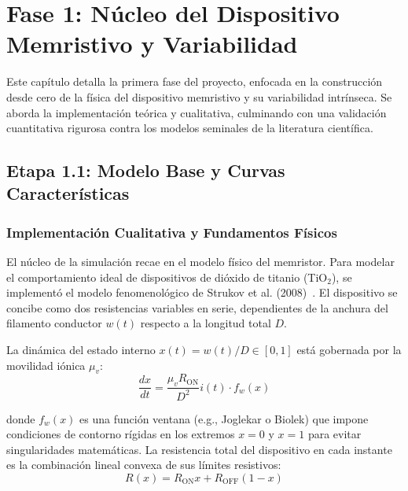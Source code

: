 
\chapter{Fase 1: Núcleo del Dispositivo Memristivo y Variabilidad}
\label{ch:fase1}

Este capítulo detalla la primera fase del proyecto, enfocada en la construcción desde cero de la física del dispositivo memristivo y su variabilidad intrínseca. Se aborda la implementación teórica y cualitativa, culminando con una validación cuantitativa rigurosa contra los modelos seminales de la literatura científica.

\section{Etapa 1.1: Modelo Base y Curvas Características}
\label{sec:etapa1_1}

\subsection{Implementación Cualitativa y Fundamentos Físicos}
El núcleo de la simulación recae en el modelo físico del memristor. Para modelar el comportamiento ideal de dispositivos de dióxido de titanio (TiO$_2$), se implementó el modelo fenomenológico de Strukov et al. (2008)~\cite{strukov2008}. El dispositivo se concibe como dos resistencias variables en serie, dependientes de la anchura del filamento conductor $w(t)$ respecto a la longitud total $D$.

La dinámica del estado interno $x(t) = w(t)/D \in [0,1]$ está gobernada por la movilidad iónica $\mu_v$:
\begin{equation}
\frac{dx}{dt} = \frac{\mu_v R_{\mathrm{ON}}}{D^2} i(t) \cdot f_w(x)
\label{eq:strukov_dinamica}
\end{equation}

donde $f_w(x)$ es una función ventana (e.g., Joglekar o Biolek) que impone condiciones de contorno rígidas en los extremos $x=0$ y $x=1$ para evitar singularidades matemáticas. La resistencia total del dispositivo en cada instante es la combinación lineal convexa de sus límites resistivos:
\begin{equation}
R(x) = R_{\mathrm{ON}} x + R_{\mathrm{OFF}} (1-x)
\label{eq:resistencia_lineal}
\end{equation}

